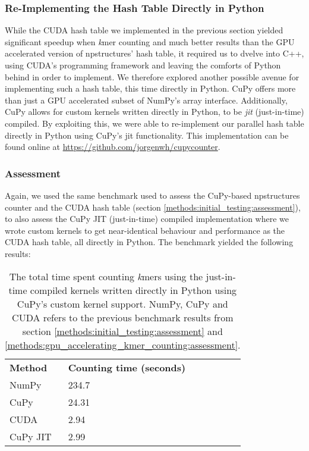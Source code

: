 \subsubsection{Re-Implementing the Hash Table Directly in Python} \label{methods:gpu_accelerating_kmer_counting_jit}
While the CUDA hash table we implemented in the previous section yielded significant speedup when \textit{k}mer counting and much better results than the GPU accelerated version of npstructures' hash table, it required us to dvelve into C++, using CUDA's programming framework and leaving the comforts of Python behind in order to implement.
We therefore explored another possible avenue for implementing such a hash table, this time directly in Python.
CuPy offers more than just a GPU accelerated subset of NumPy's array interface.
Additionally, CuPy allows for custom kernels written directly in Python, to be \textit{jit} (just-in-time) compiled.
By exploiting this, we were able to re-implement our parallel hash table directly in Python using CuPy's jit functionality.
This implementation can be found online at \url{https://github.com/jorgenwh/cupycounter}.

\subsubsection{Assessment}
Again, we used the same benchmark used to assess the CuPy-based npstructures counter and the CUDA hash table (section \ref{methods:initial_testing:assessment}), to also assess the CuPy JIT (just-in-time) compiled implementation where we wrote custom kernels to get near-identical behaviour and performance as the CUDA hash table, all directly in Python.
The benchmark yielded the following results:
\begin{table}[H]
\begin{center}
\begin{tabular}{lllll}
\multicolumn{1}{l|}{\textbf{Method}} & \multicolumn{1}{l}{\textbf{Counting time (seconds)}} &  \\ \cline{1-2}
\multicolumn{1}{l|}{NumPy} & \multicolumn{1}{l}{234.7} &  \\
\multicolumn{1}{l|}{CuPy} & \multicolumn{1}{l}{24.31} &  \\
\multicolumn{1}{l|}{CUDA} & \multicolumn{1}{l}{2.94} &  \\
\multicolumn{1}{l|}{CuPy JIT} & \multicolumn{1}{l}{2.99} &  \\
\end{tabular}
\end{center}
\caption{
  The total time spent counting \textit{k}mers using the just-in-time compiled kernels written directly in Python using CuPy's custom kernel support.
  NumPy, CuPy and CUDA refers to the previous benchmark results from section \ref{methods:initial_testing:assessment} and \ref{methods:gpu_accelerating_kmer_counting:assessment}.
}
\label{methods:gpu_accelerating_kmer_counting_jit:tables:benchmark}
\end{table}

